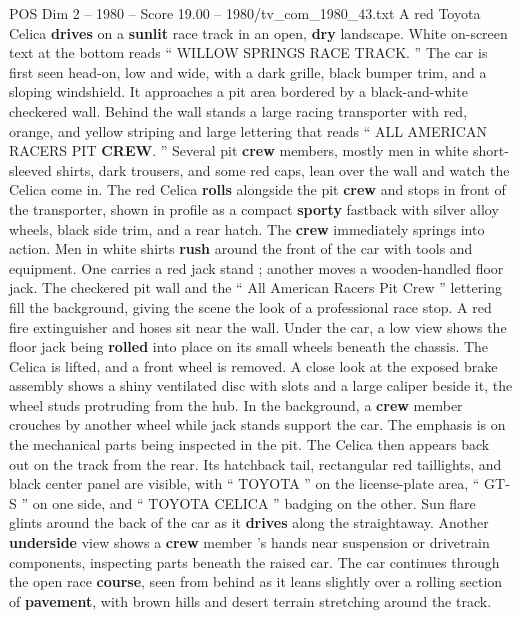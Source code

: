 \begin{textsample}{POS Dim 2 – 1980 – Score 19.00 – 1980/tv\_com\_1980\_43.txt}  \label{ex:f2_pos_063}
A red Toyota Celica \textbf{drives} on a \textbf{sunlit} race track in an open, \textbf{dry} landscape.
White on-screen text at the bottom reads “ WILLOW SPRINGS RACE TRACK. ” The car is first seen head-on, low and wide, with a dark grille, black bumper trim, and a sloping windshield.
It approaches a pit area bordered by a black-and-white checkered wall.
Behind the wall stands a large racing transporter with red, orange, and yellow striping and large lettering that reads “ ALL AMERICAN RACERS PIT \textbf{CREW}. ” Several pit \textbf{crew} members, mostly men in white short-sleeved shirts, dark trousers, and some red caps, lean over the wall and watch the Celica come in.
The red Celica \textbf{rolls} alongside the pit \textbf{crew} and stops in front of the transporter, shown in profile as a compact \textbf{sporty} fastback with silver alloy wheels, black side trim, and a rear hatch.
The \textbf{crew} immediately springs into action.
Men in white shirts \textbf{rush} around the front of the car with tools and equipment.
One carries a red jack stand ; another moves a wooden-handled floor jack.
The checkered pit wall and the “ All American Racers Pit Crew ” lettering fill the background, giving the scene the look of a professional race stop.
A red fire extinguisher and hoses sit near the wall.
Under the car, a low view shows the floor jack being \textbf{rolled} into place on its small wheels beneath the chassis.
The Celica is lifted, and a front wheel is removed.
A close look at the exposed brake assembly shows a shiny ventilated disc with slots and a large caliper beside it, the wheel studs protruding from the hub.
In the background, a \textbf{crew} member crouches by another wheel while jack stands support the car.
The emphasis is on the mechanical parts being inspected in the pit.
The Celica then appears back out on the track from the rear.
Its hatchback tail, rectangular red taillights, and black center panel are visible, with “ TOYOTA ” on the license-plate area, “ GT-S ” on one side, and “ TOYOTA CELICA ” badging on the other.
Sun flare glints around the back of the car as it \textbf{drives} along the straightaway.
Another \textbf{underside} view shows a \textbf{crew} member ’s hands near suspension or drivetrain components, inspecting parts beneath the raised car.
The car continues through the open race \textbf{course}, seen from behind as it leans slightly over a rolling section of \textbf{pavement}, with brown hills and desert terrain stretching around the track.

\end{textsample}
